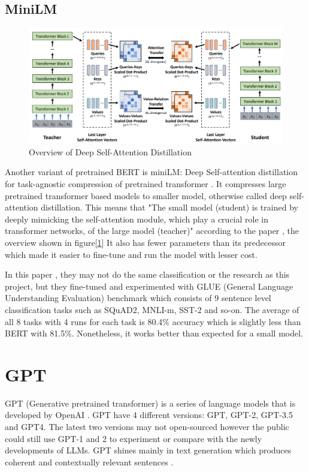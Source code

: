 \subsection{MiniLM}

\begin{figure}[ht]
    \centerline{\includegraphics[scale=.5]{Figures/deep_self-distillation.png}}
    \caption{Overview of Deep Self-Attention Distillation}
    \label{fig:distillation}
 \end{figure}

Another variant of pretrained BERT is miniLM: Deep Self-attention distillation for task-agnostic compression of pretrained transformer \cite{Wang_Wei_Dong_Bao_Yang_Zhou_2020}.
It compresses large pretrained transformer based models to smaller model, otherwise called deep self-attention distillation. This means that "The small model (student) is trained by deeply mimicking the self-attention module, which play a crucial role in transformer networks, of the large model (teacher)" according to the paper \cite{Wang_Wei_Dong_Bao_Yang_Zhou_2020}, the overview shown in figure[\ref{fig:distillation}]
It also has fewer parameters than its predecessor which made it easier to fine-tune and run the model with lesser cost. 

In this paper \cite{Wang_Wei_Dong_Bao_Yang_Zhou_2020}, they may not do the same classification or the research as this project, but they fine-tuned and experimented with GLUE (General Language Understanding Evaluation) benchmark which consists of 9 sentence level classification tasks such as SQuAD2, MNLI-m, SST-2 and so-on. The average of all 8 tasks with 4 runs for each task is 80.4\% accuracy which is slightly less than BERT with 81.5\%. Nonetheless, it works better than expected for a small model.

\section{GPT}
 GPT (Generative pretrained transformer) is a series of language models that is developed by OpenAI \cite{Jorge_2023}. GPT have 4 different versions: GPT, GPT-2, GPT-3.5 and GPT4. The latest two versions may not open-sourced however the public could still use GPT-1 and 2 to experiment or compare with the newly developments of LLMs. GPT shines mainly in text generation which produces coherent and contextually relevant sentences \cite{Jorge_2023}.
 
